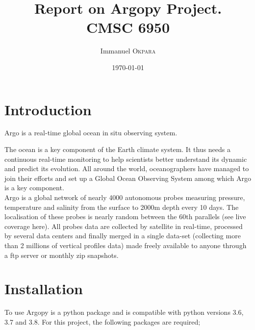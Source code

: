 \documentclass[20pt]{article}
\title{Report on Argopy Project. \\ CMSC 6950} %
\author{Immanuel \textsc{Okpara}} %
\date{\today} %
\begin{document}
\maketitle %



\section{Introduction}

Argo is a real-time global ocean in situ observing system.

The ocean is a key component of the Earth climate system. It thus needs a continuous real-time monitoring to help scientists better understand its dynamic and predict its evolution. All around the world, oceanographers have managed to join their efforts and set up a Global Ocean Observing System among which Argo is a key component.\\

Argo is a global network of nearly 4000 autonomous probes measuring pressure, temperature and salinity from the surface to 2000m depth every 10 days. The localisation of these probes is nearly random between the 60th parallels (see live coverage here). All probes data are collected by satellite in real-time, processed by several data centers and finally merged in a single data-set (collecting more than 2 millions of vertical profiles data) made freely available to anyone through a ftp server or monthly zip snapshots.\\


\section{Installation}
To use Argopy is a python package and is compatible with python versions 3.6, 3.7 and 3.8. 
For this project, the following packages are required;
\end{document}

